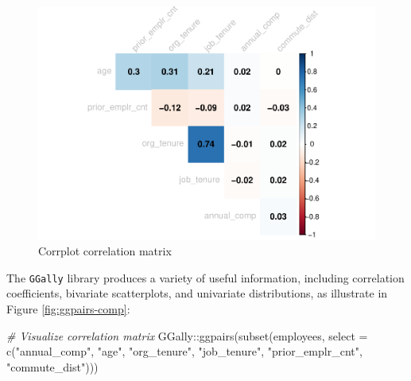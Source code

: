 \documentclass[
]{book}
\newenvironment{Shaded}{\begin{snugshade}}{\end{snugshade}}
\newcommand{\AttributeTok}[1]{\textcolor[rgb]{0.77,0.63,0.00}{#1}}
\newcommand{\CommentTok}[1]{\textcolor[rgb]{0.56,0.35,0.01}{\textit{#1}}}
\newcommand{\FunctionTok}[1]{\textcolor[rgb]{0.00,0.00,0.00}{#1}}
\newcommand{\NormalTok}[1]{#1}
\newcommand{\SpecialCharTok}[1]{\textcolor[rgb]{0.00,0.00,0.00}{#1}}
\newcommand{\StringTok}[1]{\textcolor[rgb]{0.31,0.60,0.02}{#1}}
\begin{document}
\begin{figure}

{\centering \includegraphics[width=1\linewidth]{The_Fundamentals_of_People_Analytics_files/figure-latex/corrplot-comp-1} 

}

\caption{Corrplot correlation matrix}\label{fig:corrplot-comp}
\end{figure}

The \texttt{GGally} library produces a variety of useful information, including correlation coefficients, bivariate scatterplots, and univariate distributions, as illustrate in Figure \ref{fig:ggpairs-comp}:

\begin{Shaded}
\begin{Highlighting}[]
\CommentTok{\# Visualize correlation matrix}
\NormalTok{GGally}\SpecialCharTok{::}\FunctionTok{ggpairs}\NormalTok{(}\FunctionTok{subset}\NormalTok{(employees, }\AttributeTok{select =} \FunctionTok{c}\NormalTok{(}\StringTok{"annual\_comp"}\NormalTok{, }\StringTok{"age"}\NormalTok{, }\StringTok{"org\_tenure"}\NormalTok{, }\StringTok{"job\_tenure"}\NormalTok{, }\StringTok{"prior\_emplr\_cnt"}\NormalTok{, }\StringTok{"commute\_dist"}\NormalTok{)))}
\end{Highlighting}
\end{Shaded}
\end{document}
